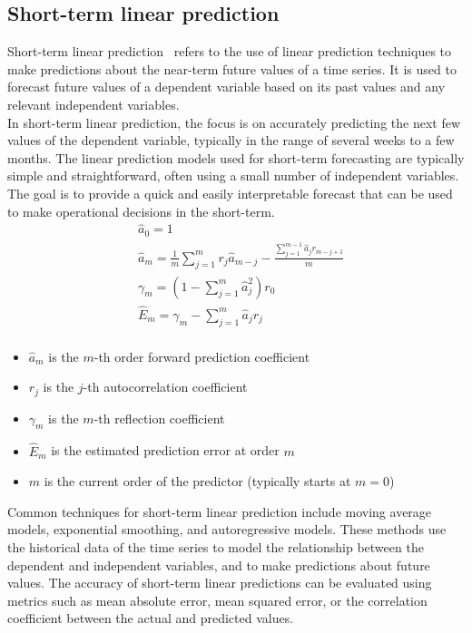         

    \subsection{Short-term linear prediction} \label{subsec:shortlp}

    Short-term linear prediction~\cite{Riahy} refers to the use of linear prediction techniques to make predictions about the near-term
    future values of a time series.
    It is used to forecast future values of a dependent variable based on its past values and any relevant independent variables.
    \\
    In short-term linear prediction, the focus is on accurately predicting the next few values of the dependent variable, typically in the range of
    several weeks to a few months. The linear prediction models used for short-term forecasting are typically simple and straightforward, often
    using a small number of independent variables. The goal is to provide a quick and easily interpretable forecast that can be used to make operational
    decisions in the short-term.
    \begin{equation}
        \begin{aligned}
            &\hat{a}_0 = 1 \\
            &\hat{a}_m = \frac{1}{m} \sum_{j=1}^{m} r_j \hat{a}_{m-j} - \frac{\sum_{j=1}^{m-1} \hat{a}_j r_{m-j+1}}{m} \\
            &\gamma_m = (1 - \sum_{j=1}^{m} \hat{a}_j^2) r_0 \\
            &\hat{E}_m = \gamma_m - \sum_{j=1}^{m} \hat{a}_j r_{j} \\
        \end{aligned}
    \end{equation}
    \begin{itemize}
        \item $\hat{a}_m$ is the $m$-th order forward prediction coefficient
        \item $r_j$ is the $j$-th autocorrelation coefficient
        \item $\gamma_m$ is the $m$-th reflection coefficient
        \item $\hat{E}_m$ is the estimated prediction error at order $m$
        \item $m$ is the current order of the predictor (typically starts at $m=0$)
    \end{itemize}
    
    Common techniques for short-term linear prediction include moving average models, exponential smoothing, and autoregressive models. These methods
    use the historical data of the time series to model the relationship between the dependent and independent variables, and to make predictions
    about future values. The accuracy of short-term linear predictions can be evaluated using metrics such as mean absolute error, mean squared
    error, or the correlation coefficient between the actual and predicted values.
    
